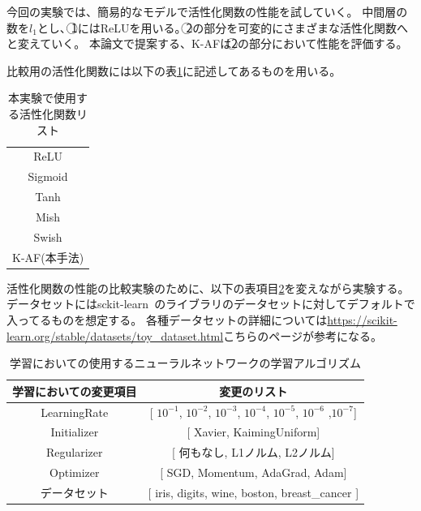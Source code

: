 今回の実験では、簡易的なモデルで活性化関数の性能を試していく。
中間層の数を$ l_1 $とし、\textcircled{\scriptsize 1}にはReLUを用いる。\textcircled{\scriptsize 2}の部分を可変的にさまざまな活性化関数へと変えていく。
本論文で提案する、K-AFは\textcircled{\scriptsize 2}の部分において性能を評価する。

比較用の活性化関数には以下の表\ref{list:af_table}に記述してあるものを用いる。


\begin{table}[htbp]
    \begin{center}
        \caption{本実験で使用する活性化関数リスト}
        \label{list:af_table}
        \vspace{2mm} 
        \begin{tabular}{ |c| }
        \hline
        ReLU \\
        Sigmoid \\
        Tanh   \\
        Mish  \\
        Swish  \\
        K-AF(本手法)   \\
        \hline
        \end{tabular}
    \end{center}
\end{table}



活性化関数の性能の比較実験のために、以下の表項目\ref{list:learning_algorithm_change}を変えながら実験する。
データセットにはsckit-learn~\cite{scikit-learn}のライブラリのデータセットに対してデフォルトで入ってるものを想定する。
各種データセットの詳細については\url{https://scikit-learn.org/stable/datasets/toy_dataset.html}こちらのページが参考になる。



\begin{table}[htbp]
    \begin{center}
        \caption{学習においての使用するニューラルネットワークの学習アルゴリズム}
        \label{list:learning_algorithm_change}
        \vspace{2mm} 
        \begin{tabular}{ |c|c| }
        \hline
        学習においての変更項目 & 変更のリスト\\
        \hline
        LearningRate           & [  $10^{-1}$,  $10^{-2}$,  $10^{-3}$,  $10^{-4}$, $10^{-5}$, $10^{-6}$ ,$10^{-7}$]    \\
        \hline
        Initializer         & [ Xavier, KaimingUniform]   \\
        \hline
        Regularizer           & [ 何もなし, L1ノルム, L2ノルム]     \\
        \hline
        Optimizer         & [ SGD, Momentum, AdaGrad, Adam]   \\
        \hline
        データセット &  [ iris, digits, wine, boston, breast\_cancer ]    \\
        \hline
        \end{tabular}
    \end{center}
\end{table}



